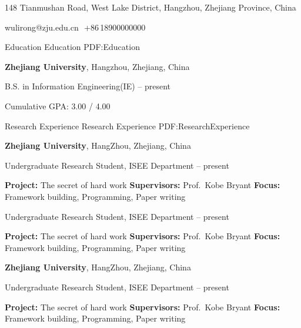 \documentclass[letterpaper,MMMyyyy,nonstopmode]{simpleresumecv}
\newcommand{\CVAuthor}{Lirong Wu}
\begin{document}
	
\Title{\CVAuthor}
\begin{SubTitle}
{148 Tianmushan Road, West Lake District, Hangzhou, Zhejiang Province, China}
\par
{wulirong@zju.edu.cn}
\,\SubBulletSymbol\,+86\,18900000000\,\SubBulletSymbol\,
\end{SubTitle}
		
\begin{Body}
	
\Section
{Education}
{Education}
{PDF:Education}
		
\Entry
{\textbf{Zhejiang University}},
Hangzhou, Zhejiang, China

\BulletItem
B.S. in  Information Engineering(IE)
\hfill
{} -- present
		
\begin{Detail}
	\SubBulletItem
	Cumulative GPA: 3.00 / 4.00
\end{Detail}
		
		
\Section
{Research Experience}
{Research Experience}
{PDF:ResearchExperience}
	
\Entry
{\textbf{Zhejiang University}}, HangZhou, Zhejiang, China

\BulletItem
Undergraduate Research Student, ISEE Department
\hfill
{} -- present
\begin{Detail}
	\SubBulletItem
	\textbf{Project:}
	The secret of hard work
	\SubBulletItem
	\textbf{Supervisors:}
	Prof.~Kobe Bryant
	\SubBulletItem
	\textbf{Focus:}
	Framework building, Programming, Paper writing
\end{Detail}

\BulletItem
Undergraduate Research Student, ISEE Department
\hfill
{} -- present
\begin{Detail}
	\SubBulletItem
	\textbf{Project:}
	The secret of hard work
	\SubBulletItem
	\textbf{Supervisors:}
	Prof.~Kobe Bryant
	\SubBulletItem
	\textbf{Focus:}
	Framework building, Programming, Paper writing
\end{Detail}
	
\Entry
{\textbf{Zhejiang University}}, HangZhou, Zhejiang, China

\BulletItem
Undergraduate Research Student, ISEE Department
\hfill
{} -- present
\begin{Detail}
	\SubBulletItem
	\textbf{Project:}
	The secret of hard work
	\SubBulletItem
	\textbf{Supervisors:}
	Prof.~Kobe Bryant
	\SubBulletItem
	\textbf{Focus:}
	Framework building, Programming, Paper writing
\end{Detail}
	

\end{Body}
\end{document}
